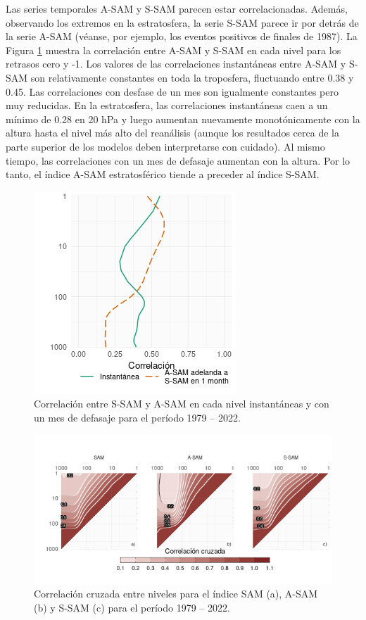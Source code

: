 \documentclass[12pt,oneside]{reedthesis}
\begin{document}
Las series temporales A-SAM y S-SAM parecen estar correlacionadas.
Además, observando los extremos en la estratosfera, la serie S-SAM parece ir por detrás de la serie A-SAM (véanse, por ejemplo, los eventos positivos de finales de 1987).
La Figura \ref{fig:cor-lev} muestra la correlación entre A-SAM y S-SAM en cada nivel para los retrasos cero y -1.
Los valores de las correlaciones instantáneas entre A-SAM y S-SAM son relativamente constantes en toda la troposfera, fluctuando entre 0.38 y 0.45.
Las correlaciones con desfase de un mes son igualmente constantes pero muy reducidas.
En la estratosfera, las correlaciones instantáneas caen a un mínimo de 0.28 en 20 hPa y luego aumentan nuevamente monotónicamente con la altura hasta el nivel más alto del reanálisis (aunque los resultados cerca de la parte superior de los modelos deben interpretarse con cuidado).
Al mismo tiempo, las correlaciones con un mes de defasaje aumentan con la altura.
Por lo tanto, el índice A-SAM estratosférico tiende a preceder al índice S-SAM.



\begin{figure}
\includegraphics{figures/30-sam/cor-lev-1} \caption{Correlación entre S-SAM y A-SAM en cada nivel instantáneas y con un mes de defasaje para el período 1979 -- 2022.}\label{fig:cor-lev}
\end{figure}



\begin{figure}
\includegraphics{figures/30-sam/cross-correlation-1} \caption{Correlación cruzada entre niveles para el índice SAM (a), A-SAM (b) y S-SAM (c) para el período 1979 -- 2022.}\label{fig:cross-correlation}
\end{figure}
\end{document}
